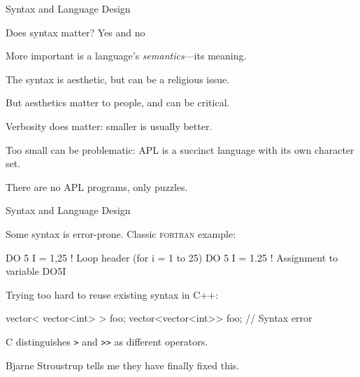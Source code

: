 \documentclass{plt}
\begin{document}
\begin{frame}[fragile]{Syntax and Language Design}

Does syntax matter?  Yes and no

More important is a language's \emph{semantics}---its meaning.

The syntax is aesthetic, but can be a religious issue.

But aesthetics matter to people, and can be critical.

Verbosity does matter: smaller is usually better.

Too small can be problematic: APL is a succinct language with its
own character set.

There are no APL programs, only puzzles.

\end{frame}

\begin{frame}[fragile]{Syntax and Language Design}

Some syntax is error-prone.  Classic \textsc{fortran} example:

\begin{fortran}
DO 5 I = 1,25  ! Loop header (for i = 1 to 25)
DO 5 I = 1.25  ! Assignment to variable DO5I
\end{fortran}

Trying too hard to reuse existing syntax in C++:

\begin{cpp}
vector< vector<int> > foo;
vector<vector<int>> foo; // Syntax error
\end{cpp}

C distinguishes \verb|>| and \verb|>>| as different operators.

Bjarne Stroustrup tells me they have finally fixed this.

\end{frame}
\end{document}
